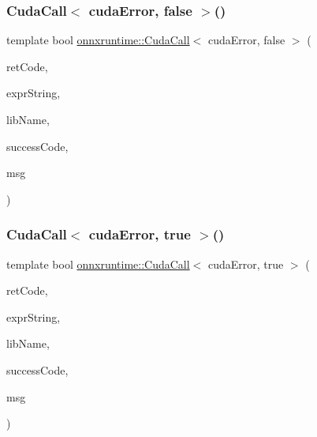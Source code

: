 \subsubsection{\texorpdfstring{Cuda\+Call$<$ cuda\+Error, false $>$()}{CudaCall< cudaError, false >()}}
{\footnotesize\ttfamily template bool \mbox{\hyperlink{namespaceonnxruntime_a4bcb94c50ee1b7834c90f0c6334986e0}{onnxruntime\+::\+Cuda\+Call}}$<$ cuda\+Error, false $>$ (\begin{DoxyParamCaption}\item[{cuda\+Error}]{ret\+Code,  }\item[{const char $\ast$}]{expr\+String,  }\item[{const char $\ast$}]{lib\+Name,  }\item[{cuda\+Error}]{success\+Code,  }\item[{const char $\ast$}]{msg }\end{DoxyParamCaption})}

\mbox{\label{namespaceonnxruntime_ade37b91b616bdb48e350f8956a282eca}} 
\subsubsection{\texorpdfstring{Cuda\+Call$<$ cuda\+Error, true $>$()}{CudaCall< cudaError, true >()}}
{\footnotesize\ttfamily template bool \mbox{\hyperlink{namespaceonnxruntime_a4bcb94c50ee1b7834c90f0c6334986e0}{onnxruntime\+::\+Cuda\+Call}}$<$ cuda\+Error, true $>$ (\begin{DoxyParamCaption}\item[{cuda\+Error}]{ret\+Code,  }\item[{const char $\ast$}]{expr\+String,  }\item[{const char $\ast$}]{lib\+Name,  }\item[{cuda\+Error}]{success\+Code,  }\item[{const char $\ast$}]{msg }\end{DoxyParamCaption})}

\mbox{\label{namespaceonnxruntime_a7fb3e122cad50ba529c2d28ea69db578}} 
